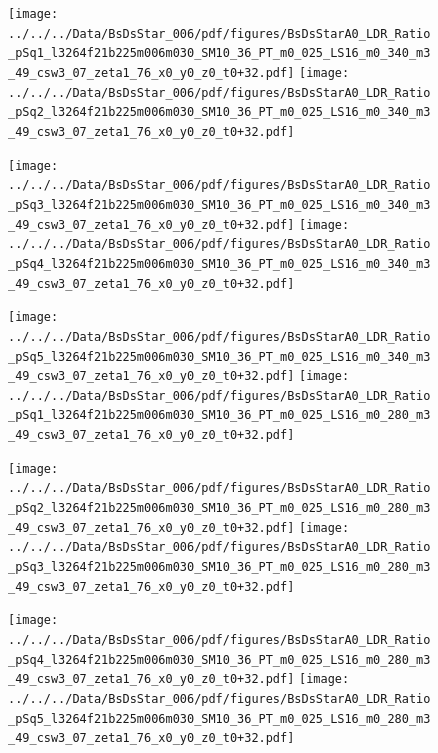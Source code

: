 \documentclass[a4paper,10pt]{article}
\begin{document}
\begin{figure}[p]
 \texttt{[image: ../../../Data/BsDsStar\_006/pdf/figures/BsDsStarA0\_LDR\_Ratio\_pSq1\_l3264f21b225m006m030\_SM10\_36\_PT\_m0\_025\_LS16\_m0\_340\_m3\_49\_csw3\_07\_zeta1\_76\_x0\_y0\_z0\_t0+32.pdf]} 
 \texttt{[image: ../../../Data/BsDsStar\_006/pdf/figures/BsDsStarA0\_LDR\_Ratio\_pSq2\_l3264f21b225m006m030\_SM10\_36\_PT\_m0\_025\_LS16\_m0\_340\_m3\_49\_csw3\_07\_zeta1\_76\_x0\_y0\_z0\_t0+32.pdf]} 
 \end{figure}
\begin{figure}[p]
 \texttt{[image: ../../../Data/BsDsStar\_006/pdf/figures/BsDsStarA0\_LDR\_Ratio\_pSq3\_l3264f21b225m006m030\_SM10\_36\_PT\_m0\_025\_LS16\_m0\_340\_m3\_49\_csw3\_07\_zeta1\_76\_x0\_y0\_z0\_t0+32.pdf]} 
 \texttt{[image: ../../../Data/BsDsStar\_006/pdf/figures/BsDsStarA0\_LDR\_Ratio\_pSq4\_l3264f21b225m006m030\_SM10\_36\_PT\_m0\_025\_LS16\_m0\_340\_m3\_49\_csw3\_07\_zeta1\_76\_x0\_y0\_z0\_t0+32.pdf]} 
 \end{figure}
\begin{figure}[p]
 \texttt{[image: ../../../Data/BsDsStar\_006/pdf/figures/BsDsStarA0\_LDR\_Ratio\_pSq5\_l3264f21b225m006m030\_SM10\_36\_PT\_m0\_025\_LS16\_m0\_340\_m3\_49\_csw3\_07\_zeta1\_76\_x0\_y0\_z0\_t0+32.pdf]} 
 \texttt{[image: ../../../Data/BsDsStar\_006/pdf/figures/BsDsStarA0\_LDR\_Ratio\_pSq1\_l3264f21b225m006m030\_SM10\_36\_PT\_m0\_025\_LS16\_m0\_280\_m3\_49\_csw3\_07\_zeta1\_76\_x0\_y0\_z0\_t0+32.pdf]} 
 \end{figure}
\clearpage
\begin{figure}[p]
 \texttt{[image: ../../../Data/BsDsStar\_006/pdf/figures/BsDsStarA0\_LDR\_Ratio\_pSq2\_l3264f21b225m006m030\_SM10\_36\_PT\_m0\_025\_LS16\_m0\_280\_m3\_49\_csw3\_07\_zeta1\_76\_x0\_y0\_z0\_t0+32.pdf]} 
 \texttt{[image: ../../../Data/BsDsStar\_006/pdf/figures/BsDsStarA0\_LDR\_Ratio\_pSq3\_l3264f21b225m006m030\_SM10\_36\_PT\_m0\_025\_LS16\_m0\_280\_m3\_49\_csw3\_07\_zeta1\_76\_x0\_y0\_z0\_t0+32.pdf]} 
 \end{figure}
\begin{figure}[p]
 \texttt{[image: ../../../Data/BsDsStar\_006/pdf/figures/BsDsStarA0\_LDR\_Ratio\_pSq4\_l3264f21b225m006m030\_SM10\_36\_PT\_m0\_025\_LS16\_m0\_280\_m3\_49\_csw3\_07\_zeta1\_76\_x0\_y0\_z0\_t0+32.pdf]} 
 \texttt{[image: ../../../Data/BsDsStar\_006/pdf/figures/BsDsStarA0\_LDR\_Ratio\_pSq5\_l3264f21b225m006m030\_SM10\_36\_PT\_m0\_025\_LS16\_m0\_280\_m3\_49\_csw3\_07\_zeta1\_76\_x0\_y0\_z0\_t0+32.pdf]} 
 \end{figure}
\clearpage
\end{document}
